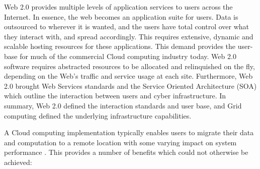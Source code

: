 Web 2.0 provides multiple levels of application services to users across the Internet.  In essence, the web becomes an application suite for users.  Data is outsourced to wherever it is wanted, and the users have total control over what they interact with, and spread accordingly.  This requires extensive, dynamic and scalable hosting resources for these applications. This demand provides the user-base for much of the commercial Cloud computing industry today.  Web 2.0 software requires abstracted resources to be allocated and relinquished on the fly, depending on the Web's traffic and service usage at each site.  Furthermore, Web 2.0 brought Web Services standards \cite{wsci} and the Service Oriented Architecture (SOA) \cite{krafzig2004} which outline the interaction between users and cyber infrastructure.  In summary, Web 2.0 defined the interaction standards and user base, and Grid computing defined the underlying infrastructure capabilities.  


A Cloud computing implementation typically enables users to migrate their data and computation to a remote location with some varying impact on system performance \cite{wang2010ngc}.  This provides a number of benefits which could not otherwise be achieved:  


